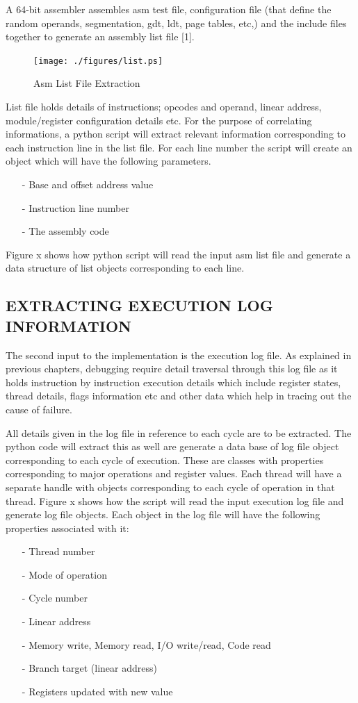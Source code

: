 A 64-bit assembler assembles asm test file, configuration file (that define the random operands, segmentation, gdt, ldt, page tables, etc,) and the include files together to generate an assembly list file [1].
\begin{figure}[H]
\centering
\texttt{[image: ./figures/list.ps]}
\caption{Asm List File Extraction}
\end{figure}
List file holds details of instructions; opcodes and operand, linear address, module/register configuration details etc. For the purpose of correlating informations, a python script will extract relevant information corresponding to each instruction line in the list file.  For each line number the script will create an object which will have the following parameters.
\begin{itemize}
	\item[-] Base and offset address value
	\item[-] Instruction line number
	\item[-] The assembly code
\end{itemize}

Figure x shows how python script will read the input asm list file and generate a data structure of list objects corresponding to each line. 

\subsection {EXTRACTING EXECUTION LOG INFORMATION}
The second input to the implementation is the execution log file. As explained in previous chapters, debugging require detail traversal through this log file as it holds instruction by instruction execution details which include register states, thread details, flags information etc and other data which help in tracing out the cause of failure. 

All details given in the log file in reference to each cycle are to be extracted. The python code will extract this as well are generate a data base of log file object corresponding to each cycle of execution. These are classes with properties corresponding to major operations and register values. Each thread will have a separate handle with objects corresponding to each cycle of operation in that thread. Figure x shows how the script will read the input execution log file and generate log file objects.
Each object in the log file will have the following properties associated with it:

\begin{itemize}
 \item[-] Thread number
 \item[-]  Mode of operation
 \item[-]  Cycle number
 \item[-]  Linear address
 \item[-]  Memory write, Memory read, I/O write/read, Code read
 \item[-]  Branch target (linear address)
 \item[-]  Registers updated with new value
\end{itemize}


